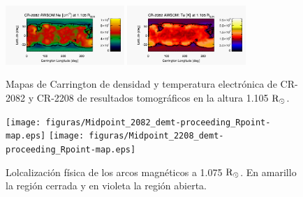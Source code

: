 \documentclass[baaa]{baaa}
\begin{document}
\begin{figure}
  \includegraphics[width=0.4\textwidth]{figuras/map_Ne_awsom_2082_185_short_1105_Rsun.jpg}
  \includegraphics[width=0.4\textwidth]{figuras/map_Te_awsom_2082_185_short_1105_Rsun.jpg}
    \caption{Mapas de Carrington de densidad y temperatura electrónica de CR-2082 y CR-2208 de resultados tomográficos en la altura  1.105 ${\rm R_\odot}$.}
  \label{fig-carrington}
\end{figure}


\begin{figure}
  \centering
  \texttt{[image: figuras/Midpoint\_2082\_demt-proceeding\_Rpoint-map.eps]}
  \texttt{[image: figuras/Midpoint\_2208\_demt-proceeding\_Rpoint-map.eps]}
  \caption{Lolcalización física de los arcos magnéticos a 1.075 ${\rm R_\odot}$. En amarillo la región cerrada y en violeta la región abierta.}
  \label{fig-rpoint}
\end{figure}
\end{document}

